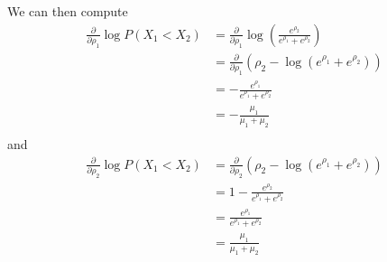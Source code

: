 \documentclass{article}
\begin{document}
	We can then compute
	\begin{align*}
	\frac{\partial}{\partial \rho_1} \log P(X_1 < X_2)
	&= \frac{\partial}{\partial \rho_1} \log \left(\frac{e^{\rho_2}}{e^{\rho_1} + e^{\rho_2}}\right) \\
	&= \frac{\partial}{\partial \rho_1} (\rho_2 - \log (e^{\rho_1} + e^{\rho_2})) \\
	&= -\frac{e^{\rho_1}}{e^{\rho_1} + e^{\rho_2}} \\
	&= -\frac{\mu_1}{\mu_1 + \mu_2} \\
	\end{align*}
	and
	\begin{align*}
	\frac{\partial}{\partial \rho_2} \log P(X_1 < X_2)
	&= \frac{\partial}{\partial \rho_2} (\rho_2 - \log (e^{\rho_1} + e^{\rho_2})) \\
	&= 1 - \frac{e^{\rho_2}}{e^{\rho_1} + e^{\rho_2}} \\
	&= \frac{e^{\rho_1}}{e^{\rho_1} + e^{\rho_2}} \\
	&= \frac{\mu_1}{\mu_1 + \mu_2} \\
	\end{align*}
	
\end{document}
